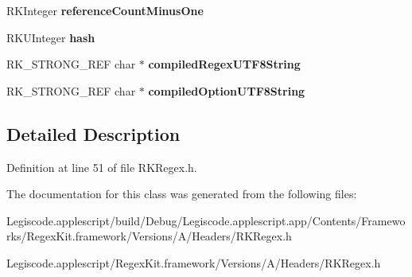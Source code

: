 \begin{DoxyCompactItemize}
\item 
\hypertarget{interface_r_k_regex_aa821e58d12e7065a25228b59d983da7f}{R\-K\-Integer {\bfseries reference\-Count\-Minus\-One}}\label{interface_r_k_regex_aa821e58d12e7065a25228b59d983da7f}

\item 
\hypertarget{interface_r_k_regex_a3869fc68f83830cfaf6f379043d36328}{R\-K\-U\-Integer {\bfseries hash}}\label{interface_r_k_regex_a3869fc68f83830cfaf6f379043d36328}

\item 
\hypertarget{interface_r_k_regex_aecbf394cc0b19998f4d805e4a29acf8f}{R\-K\-\_\-\-S\-T\-R\-O\-N\-G\-\_\-\-R\-E\-F char $\ast$ {\bfseries compiled\-Regex\-U\-T\-F8\-String}}\label{interface_r_k_regex_aecbf394cc0b19998f4d805e4a29acf8f}

\item 
\hypertarget{interface_r_k_regex_a9812824ffb4958269b8f3f40b12bdb9e}{R\-K\-\_\-\-S\-T\-R\-O\-N\-G\-\_\-\-R\-E\-F char $\ast$ {\bfseries compiled\-Option\-U\-T\-F8\-String}}\label{interface_r_k_regex_a9812824ffb4958269b8f3f40b12bdb9e}

\end{DoxyCompactItemize}


\subsection{Detailed Description}


Definition at line 51 of file R\-K\-Regex.\-h.



The documentation for this class was generated from the following files\-:\begin{DoxyCompactItemize}
\item 
Legiscode.\-applescript/build/\-Debug/\-Legiscode.\-applescript.\-app/\-Contents/\-Frameworks/\-Regex\-Kit.\-framework/\-Versions/\-A/\-Headers/R\-K\-Regex.\-h\item 
Legiscode.\-applescript/\-Regex\-Kit.\-framework/\-Versions/\-A/\-Headers/R\-K\-Regex.\-h\end{DoxyCompactItemize}
